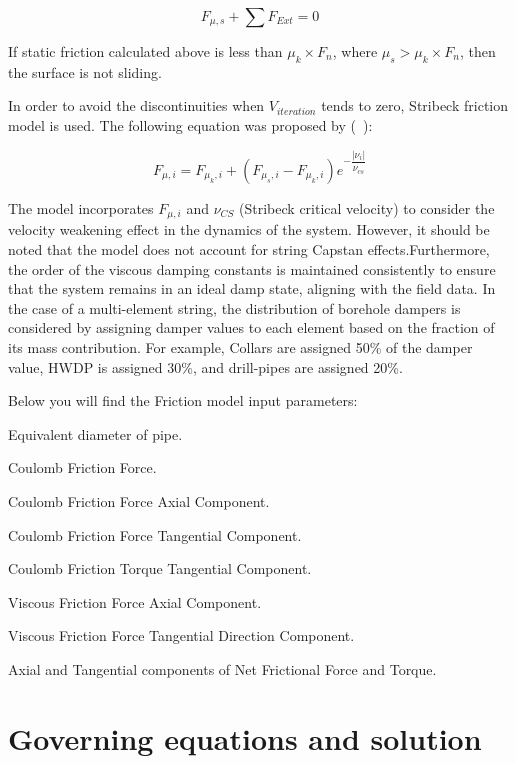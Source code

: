 \begin{equation}\label{zero}
  F_{\mu,s} + \sum F_{Ext} = 0
\end{equation}

If static friction calculated above is less than $\mu_{k}\times F_{n}$, where $\mu_{s} > \mu_{k}\times F_{n}$, then the surface is not sliding.

In order to avoid the discontinuities when $V_{iteration}$ tends to zero, Stribeck friction model is used. The following equation was proposed by (~\cite{ref:tustin1947a}):

\begin{equation}\label{Stribeck velocity}
  F_{\mu,i} = F_{\mu_{k},i} + (F_{\mu_{s},i} - F_{\mu_{k},i})e^{-\dfrac{|\nu_{i}|}{\nu_{cs}}}
\end{equation} 

The model incorporates $F_{\mu,i}$ and $\nu_{CS}$ (Stribeck critical velocity) to consider the velocity weakening effect in the dynamics of the system. However, it should be noted that the model does not account for string Capstan effects.Furthermore, the order of the viscous damping constants is maintained consistently to ensure that the system remains in an ideal damp state, aligning with the field data. In the case of a multi-element string, the distribution of borehole dampers is considered by assigning damper values to each element based on the fraction of its mass contribution. For example, Collars are assigned 50\% of the damper value, HWDP is assigned 30\%, and drill-pipes are assigned 20\%. 

Below you will find the Friction model input parameters:
\begin{bulletedlist}
    \item Equivalent diameter of pipe.
    \item Coulomb Friction Force.
    \item Coulomb Friction Force Axial Component.
    \item Coulomb Friction Force Tangential Component.
    \item Coulomb Friction Torque Tangential Component.
    \item Viscous Friction Force Axial Component.
    \item Viscous Friction Force Tangential Direction Component.
    \item Axial and Tangential components of Net Frictional Force and Torque.
\end{bulletedlist}

\section{Governing equations and solution}


